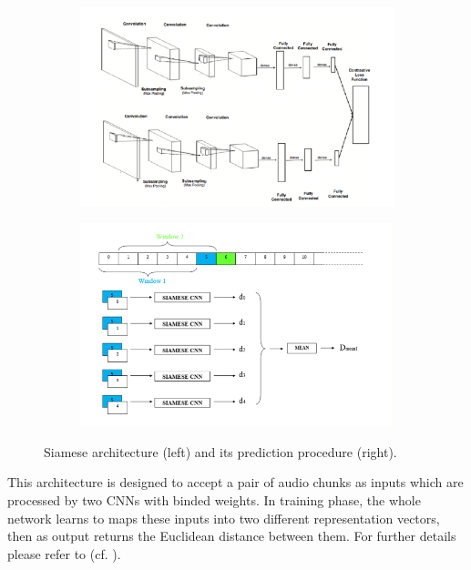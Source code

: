 \begin{figure}[h]
	\centering
	\begin{subfigure}[b]{0.48\textwidth}
		\centering
		\includegraphics[width=\columnwidth]{img/siamese}
	\end{subfigure} 	
	\begin{subfigure}[b]{0.48\textwidth}
		\centering   
		\includegraphics[width=\columnwidth]{img/siamese_predict}
	\end{subfigure} 
	\caption[Siamese architecture]{Siamese architecture (left) and its prediction procedure (right).}
	\label{fig:siamese_road}
\end{figure}

This architecture is designed to accept a pair of audio chunks as inputs which are processed by two CNNs with binded weights. In training phase, the whole network learns to maps these inputs into two different representation vectors, then as output returns the Euclidean distance between them. For further details please refer to (cf. ).

